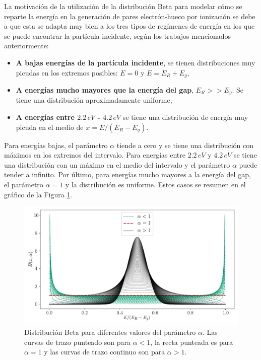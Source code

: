 La motivación de la utilización de la distribución Beta para modelar cómo se reparte la energía en la generación de pares electrón-hueco por ionización se debe a que esta se adapta muy bien a los tres tipos de regímenes de energía en los que se puede encontrar la partícula incidente, según los trabajos mencionados anteriormente:
\begin{itemize}
    \item \textbf{A bajas energías de la partícula incidente}, se tienen distribuciones muy picudas en los extremos posibles: $E = 0$ y $E = E_{R}+E_{g}$,
    \item \textbf{A energías mucho mayores que la energía del gap}, $E_{R} >> E_{g}$: Se tiene una distribución aproximadamente uniforme,
    \item \textbf{A energías entre $2.2\,\si{eV}$ - $4.2\,\si{eV}$} se tiene una distribución de energía muy picuda en el medio de $x = E/(E_{R} - E_{g})$.
\end{itemize}
Para energías bajas, el parámetro $\alpha$ tiende a cero y se tiene una distribución con máximos en los extremos del intervalo. Para energías entre $2.2\,\si{eV}$ y $4.2\,\si{eV}$ se tiene una distribución con un máximo en el medio del intervalo y el parámetro $\alpha$ puede tender a infinito. Por último, para energías mucho mayores a la energía del gap, el parámetro $\alpha = 1$ y la distribución es uniforme. Estos casos se resumen en el gráfico de la Figura \ref{fig:BetaDist}.
\begin{figure}[h]
    \centering
        \includegraphics[scale=0.5]{Figs/BetaDistFig.pdf}
    \caption{Distribución Beta para diferentes valores del parámetro $\alpha$. Las curvas de trazo punteado son para $\alpha < 1$, la recta punteada es para $\alpha=1$ y las curvas de trazo continuo son para $\alpha>1$.}
    \label{fig:BetaDist}
\end{figure}

